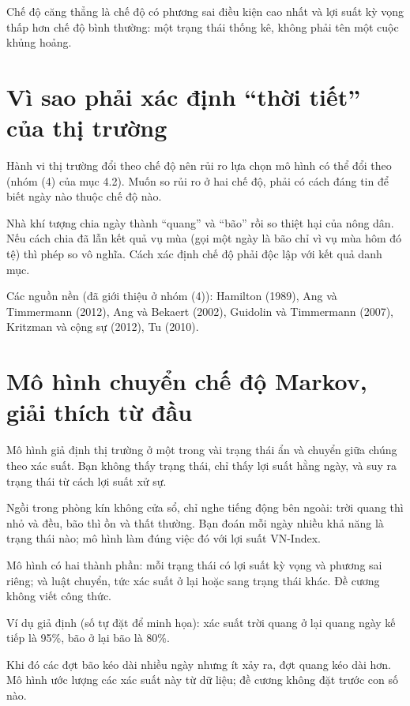 Chế độ căng thẳng là chế độ có phương sai điều kiện cao nhất và lợi suất kỳ vọng thấp hơn chế độ bình thường: một trạng thái thống kê, không phải tên một cuộc khủng hoảng.

\section{Vì sao phải xác định “thời tiết” của thị trường}

Hành vi thị trường đổi theo chế độ nên rủi ro lựa chọn mô hình có thể đổi theo (nhóm (4) của mục 4.2). Muốn so rủi ro ở hai chế độ, phải có cách đáng tin để biết ngày nào thuộc chế độ nào.

Nhà khí tượng chia ngày thành “quang” và “bão” rồi so thiệt hại của nông dân. Nếu cách chia đã lẫn kết quả vụ mùa (gọi một ngày là bão chỉ vì vụ mùa hôm đó tệ) thì phép so vô nghĩa. Cách xác định chế độ phải độc lập với kết quả danh mục.

Các nguồn nền (đã giới thiệu ở nhóm (4)): Hamilton (1989), Ang và Timmermann (2012), Ang và Bekaert (2002), Guidolin và Timmermann (2007), Kritzman và cộng sự (2012), Tu (2010).

\section{Mô hình chuyển chế độ Markov, giải thích từ đầu}

Mô hình giả định thị trường ở một trong vài trạng thái ẩn và chuyển giữa chúng theo xác suất. Bạn không thấy trạng thái, chỉ thấy lợi suất hằng ngày, và suy ra trạng thái từ cách lợi suất xử sự.

Ngồi trong phòng kín không cửa sổ, chỉ nghe tiếng động bên ngoài: trời quang thì nhỏ và đều, bão thì ồn và thất thường. Bạn đoán mỗi ngày nhiều khả năng là trạng thái nào; mô hình làm đúng việc đó với lợi suất VN-Index.

Mô hình có hai thành phần: mỗi trạng thái có lợi suất kỳ vọng và phương sai riêng; và luật chuyển, tức xác suất ở lại hoặc sang trạng thái khác. Đề cương không viết công thức.

\begin{tcolorbox}[breakable]
Ví dụ giả định (số tự đặt để minh họa): xác suất trời quang ở lại quang ngày kế tiếp là 95\%, bão ở lại bão là 80\%.

Khi đó các đợt bão kéo dài nhiều ngày nhưng ít xảy ra, đợt quang kéo dài hơn. Mô hình ước lượng các xác suất này từ dữ liệu; đề cương không đặt trước con số nào.
\end{tcolorbox}

